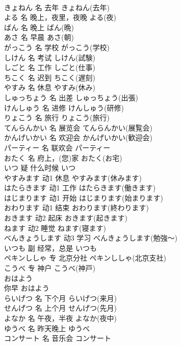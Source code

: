 \documentclass[8pt]{extreport}
\begin{document}
\begin{CJK}{UTF8}{min}
\\	きょねん	名	去年	きょねん(去年)	
\\	よる	名	晚上，夜里，夜晚	よる(夜)	
\\	ばん	名	晚上	ばん(晩)	
\\	あさ	名	早晨	あさ(朝)	
\\	がっこう	名	学校	がっこう(学校)	
\\	しけん	名	考试	しけん(試験)	
\\	しごと	名	工作	しごと(仕事)	
\\	ちこく	名	迟到	ちこく(遅刻)	
\\	やすみ	名	休息	やすみ(休み)	
\\	しゅっちょう	名	出差	しゅっちょう(出張)	
\\	けんしゅう	名	进修	けんしゅう(研修)	
\\	りょこう	名	旅行	りょこう(旅行)	
\\	てんらんかい	名	展览会	てんらんかい(展覧会)	
\\	かんげいかい	名	欢迎会	かんげいかい(歓迎会)	
\\	パーティー	名	联欢会	パーティー	
\\	おたく	名	府上，(您)家	おたく(お宅)	
\\	いつ	疑	什么时候	いつ	
\\	やすみます	动1	休息	やすみます(休みます)	
\\	はたらきます	动1	工作	はたらきます(働きます)	
\\	はじまります	动1	开始	はじまります(始まります)	
\\	おわります	动1	结束	おわります(終わります)	
\\	おきます	动2	起床	おきます(起きます)	
\\	ねます	动2	睡觉	ねます(寝ます)	
\\	べんきょうします	动3	学习	べんきょうします(勉強～)	
\\	いつも	副	经常，总是	いつも	
\\	ペキンししゃ	专	北京分社	ペキンししゃ(北京支社)	
\\	こうべ	专	神户	こうべ(神戸)	
\\	おはよう	
\\	你早	おはよう	
\\	らいげつ	名	下个月	らいげつ(来月)	
\\	せんげつ	名	上个月	せんげつ(先月)	
\\	よなか	名	午夜，半夜	よなか(夜中)	
\\	ゆうべ	名	昨天晚上	ゆうべ	
\\	コンサート	名	音乐会	コンサート	

\end{CJK}
\end{document}
